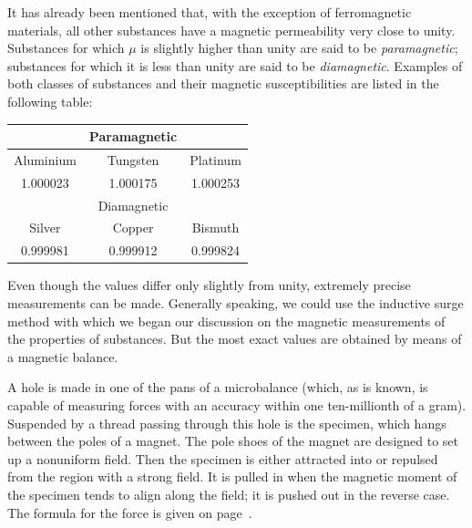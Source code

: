 It has already been mentioned that, with the exception of ferromagnetic materials, all other substances have a magnetic permeability very close to unity. Substances for which $\mu$ is slightly higher than unity are said to be \emph{paramagnetic}; substances for which it is less than unity are said to be \emph{diamagnetic}. Examples of both classes of substances and their magnetic susceptibilities are listed in the following table:
\begin{center}
\begin{tabular}{ccc}
\toprule
 & Paramagnetic & \\
\midrule
 Aluminium & Tungsten & Platinum\\
 1.000023 & 1.000175 & 1.000253\\
\toprule
 & Diamagnetic & \\
\midrule
 Silver & Copper & Bismuth \\
0.999981 & 0.999912 & 0.999824\\
\bottomrule
\end{tabular}
\end{center}


Even though the values differ only slightly from unity, extremely precise measurements can be made. Generally speaking, we could use the inductive surge method with which we began our discussion on the magnetic measurements of the properties of substances. But the most exact values are obtained by means of a magnetic balance.

A hole is made in one of the pans of a microbalance (which, as is known, is capable of measuring forces with an accuracy within one ten-millionth of a gram). Suspended by a thread passing through this hole is the specimen, which hangs between the poles of a magnet. The pole shoes of the magnet are designed to set up a nonuniform field. Then the specimen is either attracted into or repulsed from the region with a strong field. It is pulled in when the magnetic moment of the specimen tends to align along the field; it is pushed out in the reverse case. The formula for the force is given on page~\pageref{force-mag}.

